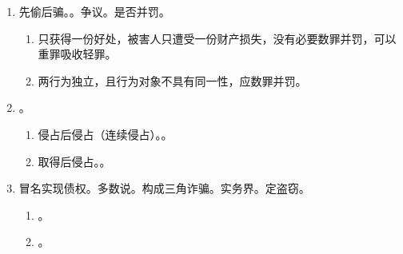 \begin{enumerate}
\begin{enumerate}
        \end{enumerate}
  \item 先偷后骗。。争议。是否并罚。
        \begin{enumerate}
          \item 只获得一份好处，被害人只遭受一份财产损失，没有必要数罪并罚，可以重罪吸收轻罪。
          \item 两行为独立，且行为对象不具有同一性，应数罪并罚。
        \end{enumerate}
  \item {}。
        \begin{enumerate}
          \item 侵占后侵占（连续侵占）。。
          \item 取得后侵占。。
        \end{enumerate}
  \item 冒名实现债权。\yi 多数说。构成三角诈骗。\er 实务界。定盗窃。
        \begin{enumerate}
          \item {}。
          \item {}。
        \end{enumerate}
\end{enumerate}
